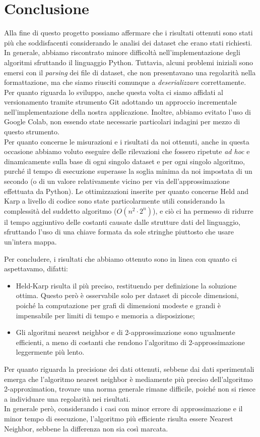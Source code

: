 \section{Conclusione}

Alla fine di questo progetto possiamo affermare che i risultati ottenuti sono stati più che soddisfacenti considerando le analisi dei dataset che erano stati richiesti. In generale, abbiamo riscontrato minore difficoltà nell'implementazione degli algoritmi sfruttando il linguaggio Python. Tuttavia, alcuni problemi iniziali sono emersi con il \textit{parsing} dei file di dataset, che non presentavano una regolarità nella formattazione, ma che siamo riusciti comunque a \textit{deserializzare} correttamente. \\ %
Per quanto riguarda lo sviluppo, anche questa volta ci siamo affidati al versionamento tramite strumento Git adottando un approccio incrementale nell'implementazione della nostra applicazione. Inoltre, abbiamo evitato l'uso di Google Colab, non essendo state necessarie particolari indagini per mezzo di questo strumento. \\
Per quanto concerne le misurazioni e i risultati da noi ottenuti, anche in questa occasione abbiamo voluto eseguire delle rilevazioni che fossero ripetute \textit{ad hoc} e dinamicamente sulla base di ogni singolo dataset e per ogni singolo algoritmo, purché il tempo di esecuzione superasse la soglia minima da noi impostata di un secondo (o di un valore relativamente vicino per via dell'approssimazione effettuata da Python).
Le ottimizzazioni inserite per quanto concerne Held and Karp a livello di codice sono state particolarmente utili considerando la complessità del suddetto algoritmo (\(O(n^2\cdot2^n)\)), e ciò ci ha permesso di ridurre il tempo aggiuntivo delle costanti causate dalle strutture dati del linguaggio, sfruttando l'uso di una chiave formata da sole stringhe piuttosto che usare un'intera mappa. 

\noindent Per concludere, i risultati che abbiamo ottenuto sono in linea con quanto ci aspettavamo, difatti:
\begin{itemize}
  \item Held-Karp risulta il più preciso, restituendo per definizione la soluzione ottima. Questo però è osservabile solo per dataset di piccole dimensioni, poiché la computazione per grafi di dimensioni modeste e grandi è impensabile per limiti di tempo e memoria a disposizione;
  \item Gli algoritmi nearest neighbor e di 2-approssimazione sono ugualmente efficienti, a meno di costanti che rendono l'algoritmo di 2-approssimazione leggermente più lento.
\end{itemize}

Per quanto riguarda la precisione dei dati ottenuti, sebbene dai dati sperimentali emerga che l'algoritmo nearest neighbor è mediamente più preciso dell'algoritmo 2-approximation, trovare una norma generale rimane difficile, poiché non si riesce a individuare una regolarità nei risultati. \\
In generale però, considerando i casi con minor errore di approssimazione e il minor tempo di esecuzione, l'algoritmo più efficiente risulta essere Nearest Neighbor, sebbene la differenza non sia così marcata. 